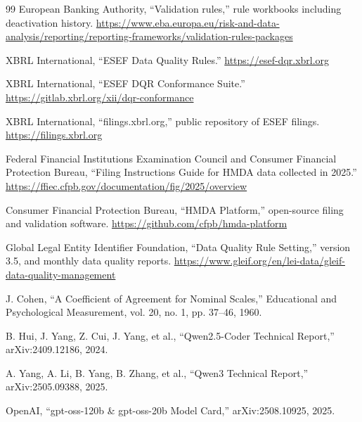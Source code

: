 \documentclass[11pt,a4paper]{article}
\begin{document}
\begin{thebibliography}{99}
 European Banking Authority, ``Validation rules,'' rule workbooks including deactivation history. \url{https://www.eba.europa.eu/risk-and-data-analysis/reporting/reporting-frameworks/validation-rules-packages}

 XBRL International, ``ESEF Data Quality Rules.'' \url{https://esef-dqr.xbrl.org}

 XBRL International, ``ESEF DQR Conformance Suite.'' \url{https://gitlab.xbrl.org/xii/dqr-conformance}

 XBRL International, ``filings.xbrl.org,'' public repository of ESEF filings. \url{https://filings.xbrl.org}

 Federal Financial Institutions Examination Council and Consumer Financial Protection Bureau, ``Filing Instructions Guide for HMDA data collected in 2025.'' \url{https://ffiec.cfpb.gov/documentation/fig/2025/overview}

 Consumer Financial Protection Bureau, ``HMDA Platform,'' open-source filing and validation software. \url{https://github.com/cfpb/hmda-platform}

 Global Legal Entity Identifier Foundation, ``Data Quality Rule Setting,'' version 3.5, and monthly data quality reports. \url{https://www.gleif.org/en/lei-data/gleif-data-quality-management}

 J. Cohen, ``A Coefficient of Agreement for Nominal Scales,'' Educational and Psychological Measurement, vol. 20, no. 1, pp. 37--46, 1960.

 B. Hui, J. Yang, Z. Cui, J. Yang, et al., ``Qwen2.5-Coder Technical Report,'' arXiv:2409.12186, 2024.

 A. Yang, A. Li, B. Yang, B. Zhang, et al., ``Qwen3 Technical Report,'' arXiv:2505.09388, 2025.

 OpenAI, ``gpt-oss-120b \& gpt-oss-20b Model Card,'' arXiv:2508.10925, 2025.

\end{thebibliography}
\end{document}
